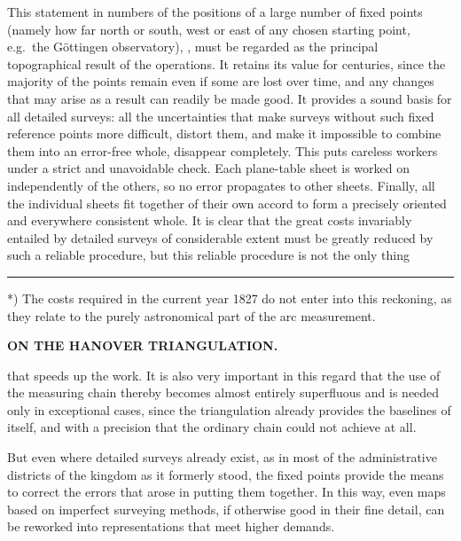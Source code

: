 This statement in numbers of the positions of a large number of fixed points
(namely how far north or south, west or east of any chosen starting point,
e.g.\ the Göttingen observatory), ,
must be regarded as the principal topographical result of the operations. It
retains its value for centuries, since the majority of the points remain even
if some are lost over time, and any changes that may arise as a result can
readily be made good. It provides a sound basis for all detailed surveys: all
the uncertainties that make surveys without such fixed reference points more
difficult, distort them, and make it impossible to combine them into an error-free
whole, disappear completely. This puts careless workers under a strict and
unavoidable check. Each plane-table sheet is worked on independently of the
others, so no error propagates to other sheets. Finally, all the individual
sheets fit together of their own accord to form a precisely oriented and
everywhere consistent whole. It is clear that the great costs invariably
entailed by detailed surveys of considerable extent must be greatly reduced
by such a reliable procedure, but this reliable procedure is not the only thing
\par\vfill\noindent\rule{0.25\linewidth}{0.4pt}\par\smallskip
{\footnotesize\noindent\hspace*{\parindent}*) The costs required in the current year 1827 do not enter into this reckoning, as they relate to the purely astronomical part of the arc measurement.\par}
\clearpage
\noindent\null\hfill{\small\textbf{ON THE HANOVER TRIANGULATION.}}\hfill{}\par\medskip
\noindent that speeds up the work. It is also very important in this regard
that the use of the measuring chain thereby becomes almost entirely superfluous
and is needed only in exceptional cases, since the triangulation already
provides the baselines of itself, and with a precision that the ordinary chain
could not achieve at all.

But even where detailed surveys already exist, as in most of the administrative
districts of the kingdom as it formerly stood, the fixed points provide the
means to correct the errors that arose in putting them together. In this way,
even maps based on imperfect surveying methods, if otherwise good in their
fine detail, can be reworked into representations that meet higher demands.

